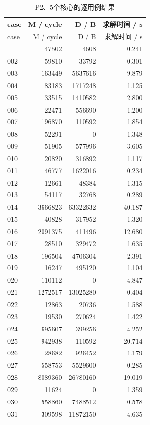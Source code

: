 \documentclass[anonymous,notoc]{gmcm2026}
\begin{document}
\begin{longtable}{lrrr}
\caption{P2、5个核心的逐用例结果}\\
\toprule
case & M / cycle & D / B & 求解时间 / s\\\midrule
\endfirsthead
\toprule
case & M / cycle & D / B & 求解时间 / s\\\midrule
\endhead
\bottomrule\endfoot
001 & 47502 & 4608 & 0.241 \\
002 & 59810 & 33792 & 0.301 \\
003 & 163449 & 5637616 & 9.879 \\
004 & 83183 & 1717248 & 1.125 \\
005 & 33515 & 1410582 & 2.800 \\
006 & 22471 & 556690 & 1.200 \\
007 & 196870 & 110592 & 1.854 \\
008 & 52291 & 0 & 1.348 \\
009 & 51905 & 577996 & 3.605 \\
010 & 20820 & 316892 & 1.117 \\
011 & 46777 & 1622016 & 0.234 \\
012 & 12661 & 48384 & 1.315 \\
013 & 54117 & 32768 & 0.289 \\
014 & 3666823 & 63322632 & 40.187 \\
015 & 40828 & 317952 & 1.320 \\
016 & 2091375 & 411496 & 12.680 \\
017 & 28510 & 329472 & 1.635 \\
018 & 196504 & 4706304 & 2.391 \\
019 & 16247 & 495120 & 1.104 \\
020 & 110112 & 0 & 4.847 \\
021 & 1272517 & 13025280 & 0.404 \\
022 & 12863 & 20736 & 1.588 \\
023 & 19530 & 270624 & 1.422 \\
024 & 695607 & 399256 & 4.252 \\
025 & 942938 & 110592 & 20.714 \\
026 & 28682 & 926452 & 1.179 \\
027 & 558753 & 5529600 & 0.285 \\
028 & 8089360 & 26780160 & 19.019 \\
029 & 11624 & 0 & 1.359 \\
030 & 558860 & 7488512 & 0.578 \\
031 & 309598 & 11872150 & 4.635 \\

\end{longtable}
\end{document}
